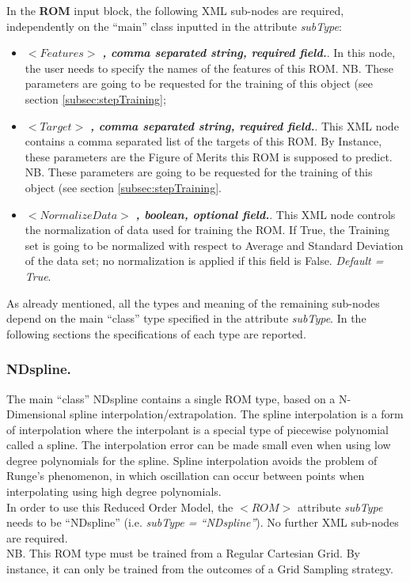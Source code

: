 In the \textbf{ROM} input block, the following XML sub-nodes are required, independently on the ``main'' class inputted in the attribute \textit{subType}:
\begin{itemize}
   \item $<Features>$ \textbf{\textit{, comma separated string, required field.}}. In this node, the user needs to specify the names of the features of this ROM. NB. These parameters are going to be requested for the training of this object (see section \ref{subsec:stepTraining};
    \item $<Target>$ \textbf{\textit{, comma separated string, required field.}}. This XML node contains a comma separated list of the targets of this ROM. By Instance, these parameters are the Figure of Merits this ROM is supposed to predict.
    \\NB. These parameters are going to be requested for the training of this object (see section \ref{subsec:stepTraining}.
    \item $<NormalizeData>$ \textbf{\textit{, boolean, optional field.}}. This XML node controls the normalization of data used for training the ROM. If True, the Training set is going to be normalized with respect to Average and Standard Deviation of the data set; no normalization is applied if this field is False. \textit{Default =  True}.
\end{itemize}
As already mentioned, all the types and meaning of the remaining sub-nodes depend on the main ``class'' type specified in the attribute \textit{subType}. In the following sections the specifications of each type are reported.
\subsubsection{NDspline.}
\label{subsubsec:NDspline}
The main ``class'' NDspline contains a single ROM type, based on a N-Dimensional spline interpolation/extrapolation. The spline interpolation is a form of interpolation where the interpolant is a special type of piecewise polynomial called a spline. The interpolation error can be made small even when using low degree polynomials for the spline. Spline interpolation avoids the problem of Runge's phenomenon, in which oscillation can occur between points when interpolating using high degree polynomials.
\\In order to use this Reduced Order Model, the $<ROM>$ attribute \textit{subType} needs to be ``NDspline'' (i.e. \textit{subType = ``NDspline''}). No further XML sub-nodes are required.
\\NB. This ROM type must be trained from a Regular Cartesian Grid. By instance, it can only be trained from the outcomes of a Grid Sampling strategy. 

